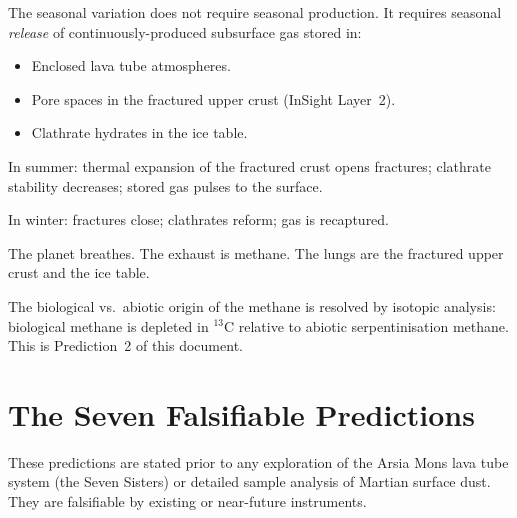 \documentclass[11pt, a4paper]{article}
\begin{document}
The seasonal variation does not require
seasonal production. It requires seasonal
\emph{release} of continuously-produced
subsurface gas stored in:
\begin{itemize}[leftmargin=*]
\item Enclosed lava tube atmospheres.
\item Pore spaces in the fractured upper
  crust (InSight Layer~2).
\item Clathrate hydrates in the ice table.
\end{itemize}

In summer: thermal expansion of the
fractured crust opens fractures;
clathrate stability decreases; stored
gas pulses to the surface.

In winter: fractures close; clathrates
reform; gas is recaptured.

The planet breathes. The exhaust is methane.
The lungs are the fractured upper crust
and the ice table.

The biological vs.\ abiotic origin of the
methane is resolved by isotopic analysis:
biological methane is depleted in $^{13}$C
relative to abiotic serpentinisation methane.
This is Prediction~2 of this document.

\section{The Seven Falsifiable Predictions}

These predictions are stated prior to any
exploration of the Arsia Mons lava tube
system (the Seven Sisters) or detailed
sample analysis of Martian surface dust.
They are falsifiable by existing or
near-future instruments.
\end{document}
